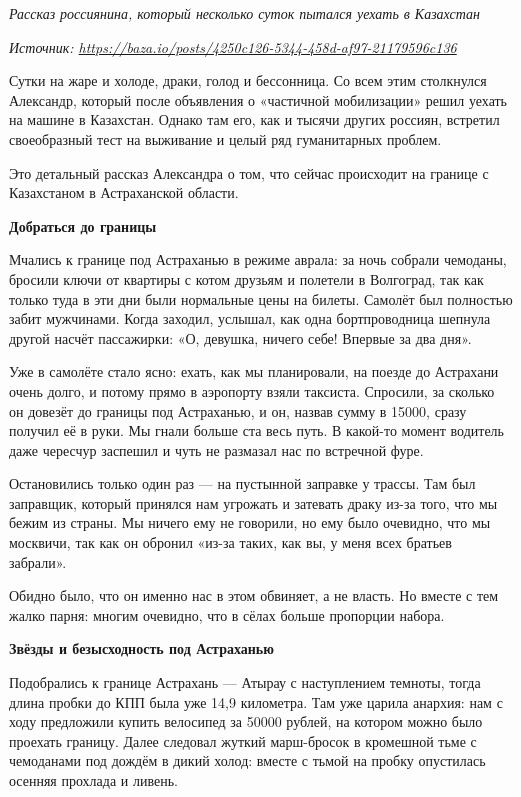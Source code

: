 \textit{Рассказ россиянина, который несколько суток пытался уехать в Казахстан }

\textit{Источник: \url{https://baza.io/posts/4250c126-5344-458d-af97-21179596c136}}

Сутки на жаре и холоде, драки, голод и бессонница. Со всем этим столкнулся Александр, который после объявления о «частичной мобилизации» решил уехать на машине в Казахстан. Однако там его, как и тысячи других россиян, встретил своеобразный тест на выживание и целый ряд гуманитарных проблем.

Это детальный рассказ Александра о том, что сейчас происходит на границе с Казахстаном в Астраханской области.


\textbf{Добраться до границы}

Мчались к границе под Астраханью в режиме аврала: за ночь собрали чемоданы, бросили ключи от квартиры с котом друзьям и полетели в Волгоград, так как только туда в эти дни были нормальные цены на билеты. Самолёт был полностью забит мужчинами. Когда заходил, услышал, как одна бортпроводница шепнула другой насчёт пассажирки: «О, девушка, ничего себе! Впервые за два дня».

Уже в самолёте стало ясно: ехать, как мы планировали, на поезде до Астрахани очень долго, и потому прямо в аэропорту взяли таксиста. Спросили, за сколько он довезёт до границы под Астраханью, и он, назвав сумму в 15000, сразу получил её в руки. Мы гнали больше ста весь путь. В какой-то момент водитель даже чересчур заспешил и чуть не размазал нас по встречной фуре.

Остановились только один раз — на пустынной заправке у трассы. Там был заправщик, который принялся нам угрожать и затевать драку из-за того, что мы бежим из страны. Мы ничего ему не говорили, но ему было очевидно, что мы москвичи, так как он обронил «из-за таких, как вы, у меня всех братьев забрали».

Обидно было, что он именно нас в этом обвиняет, а не власть. Но вместе с тем жалко парня: многим очевидно, что в сёлах больше пропорции набора.


\textbf{Звёзды и безысходность под Астраханью}

Подобрались к границе Астрахань — Атырау с наступлением темноты, тогда длина пробки до КПП была уже 14,9 километра. Там уже царила анархия: нам с ходу предложили купить велосипед за 50000 рублей, на котором можно было проехать границу. Далее следовал жуткий марш-бросок в кромешной тьме с чемоданами под дождём в дикий холод: вместе с тьмой на пробку опустилась осенняя прохлада и ливень.

